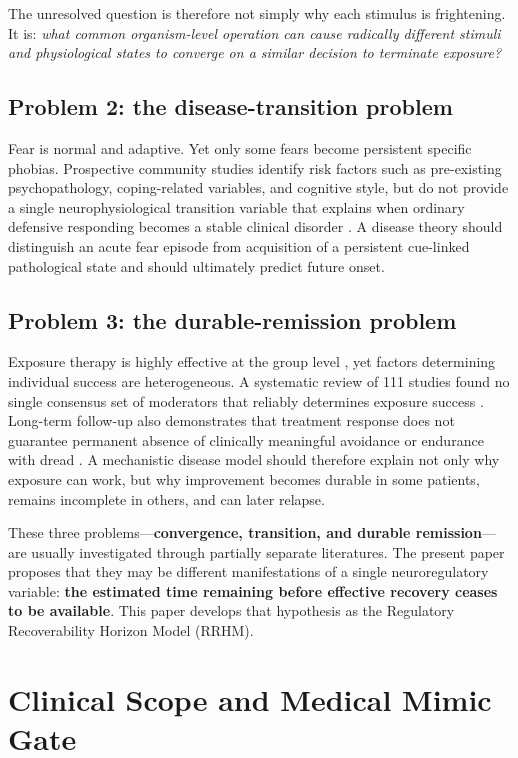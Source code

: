 \documentclass[11pt]{article}
\begin{document}
The unresolved question is therefore not simply why each stimulus is frightening. It is: \emph{what common organism-level operation can cause radically different stimuli and physiological states to converge on a similar decision to terminate exposure?}

\subsection{Problem 2: the disease-transition problem}

Fear is normal and adaptive. Yet only some fears become persistent specific phobias. Prospective community studies identify risk factors such as pre-existing psychopathology, coping-related variables, and cognitive style, but do not provide a single neurophysiological transition variable that explains when ordinary defensive responding becomes a stable clinical disorder \cite{trumpf2010incidence}. A disease theory should distinguish an acute fear episode from acquisition of a persistent cue-linked pathological state and should ultimately predict future onset.

\subsection{Problem 3: the durable-remission problem}

Exposure therapy is highly effective at the group level \cite{odgers2022}, yet factors determining individual success are heterogeneous. A systematic review of 111 studies found no single consensus set of moderators that reliably determines exposure success \cite{bohnlein2020}. Long-term follow-up also demonstrates that treatment response does not guarantee permanent absence of clinically meaningful avoidance or endurance with dread \cite{ost2000longterm}. A mechanistic disease model should therefore explain not only why exposure can work, but why improvement becomes durable in some patients, remains incomplete in others, and can later relapse.

These three problems---\textbf{convergence, transition, and durable remission}---are usually investigated through partially separate literatures. The present paper proposes that they may be different manifestations of a single neuroregulatory variable: \textbf{the estimated time remaining before effective recovery ceases to be available}. This paper develops that hypothesis as the Regulatory Recoverability Horizon Model (RRHM).

\section{Clinical Scope and Medical Mimic Gate}
\end{document}
